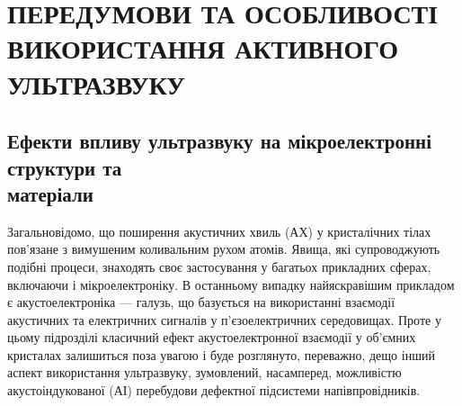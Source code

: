 \chapter{\MakeUppercase{Передумови та особливості використання активного ультразвуку}}



\section{Ефекти впливу ультразвуку на мікроелектронні структури та \\ матеріали \label{Oglyad}}

Загальновідомо, що поширення акустичних хвиль (АХ) у кристалічних тілах пов'язане з вимушеним коливальним рухом атомів.
Явища, які супроводжують подібні процеси, знаходять своє застосування у багатьох прикладних сферах, включаючи і мікроелектроніку.
В останньому випадку найяскравішим прикладом є акустоелектроніка --- галузь, що базується на використанні взаємодії акустичних та електричних сигналів у п'єзоелектричних середовищах.
Проте у цьому підрозділі класичний ефект акустоелектронної взаємодії у об'ємних кристалах залишиться поза увагою і буде
розглянуто, переважно, дещо інший аспект використання ультразвуку,
зумовлений, насамперед, можливістю акустоіндукованої (АІ) перебудови дефектної підсистеми напівпровідників.

